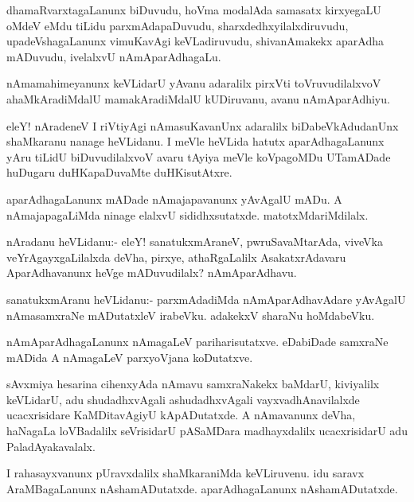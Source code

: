 \begin{mng}
dhamaRvarxtagaLanunx biDuvudu, hoVma modalAda samasatx kirxyegaLU oMdeV eMdu tiLidu parxmAdapaDuvudu, sharxdedhxyilalxdiruvudu, upadeVshagaLanunx vimuKavAgi keVLadiruvudu, shivanAmakekx aparAdha mADuvudu, ivelalxvU nAmAparAdhagaLu.
\end{mng}

\begin{mng}
nAmamahimeyanunx keVLidarU yAvanu adaralilx pirxVti toVruvudilalxvoV ahaMkAradiMdalU mamakAradiMdalU kUDiruvanu, avanu nAmAparAdhiyu.
\end{mng}

\begin{mng}
eleY! nAradeneV I riVtiyAgi nAmasuKavanUnx adaralilx biDabeVkAdudanUnx shaMkaranu nanage heVLidanu. I meVle heVLida hatutx aparAdhagaLanunx yAru tiLidU biDuvudilalxvoV avaru tAyiya meVle koVpagoMDu UTamADade huDugaru duHKapaDuvaMte duHKisutAtxre.
\end{mng}

\begin{mng}
aparAdhagaLanunx mADade nAmajapavanunx yAvAgalU mADu. A nAmajapagaLiMda ninage elalxvU sididhxsutatxde. matotxMdariMdilalx.
\end{mng}

\begin{mng}
nAradanu heVLidanu:- eleY! sanatukxmAraneV, pwruSavaMtarAda, viveVka veYrAgayxgaLilalxda deVha, pirxye, athaRgaLalilx AsakatxrAdavaru AparAdhavanunx heVge mADuvudilalx? nAmAparAdhavu.
\end{mng}

\begin{mng}
sanatukxmAranu heVLidanu:- parxmAdadiMda nAmAparAdhavAdare yAvAgalU nAmasamxraNe mADutatxleV irabeVku. adakekxV sharaNu hoMdabeVku.
\end{mng}

\begin{mng}
nAmAparAdhagaLanunx nAmagaLeV pariharisutatxve. eDabiDade samxraNe mADida A nAmagaLeV parxyoVjana koDutatxve.
\end{mng}

\begin{mng}
sAvxmiya hesarina cihenxyAda nAmavu samxraNakekx baMdarU, kiviyalilx keVLidarU, adu shudadhxvAgali ashudadhxvAgali vayxvadhAnavilalxde ucacxrisidare KaMDitavAgiyU kApADutatxde. A nAmavanunx deVha, haNagaLa loVBadalilx seVrisidarU pASaMDara madhayxdalilx ucacxrisidarU adu PaladAyakavalalx.
\end{mng}

\begin{mng}
I rahasayxvanunx pUravxdalilx shaMkaraniMda keVLiruvenu. idu saravx AraMBagaLanunx nAshamADutatxde. aparAdhagaLanunx nAshamADutatxde.
\end{mng}


